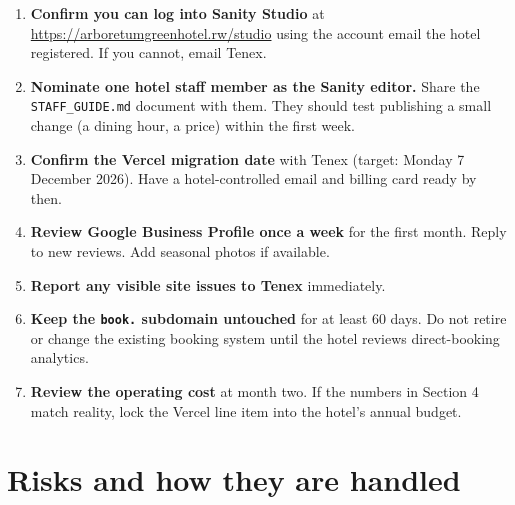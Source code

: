 \documentclass[11pt,a4paper]{article}
\begin{document}
\begin{enumerate}
\item \textbf{Confirm you can log into Sanity Studio} at \url{https://arboretumgreenhotel.rw/studio} using the account email the hotel registered. If you cannot, email Tenex.
\item \textbf{Nominate one hotel staff member as the Sanity editor.} Share the \texttt{STAFF\_GUIDE.md} document with them. They should test publishing a small change (a dining hour, a price) within the first week.
\item \textbf{Confirm the Vercel migration date} with Tenex (target: Monday 7 December 2026). Have a hotel-controlled email and billing card ready by then.
\item \textbf{Review Google Business Profile once a week} for the first month. Reply to new reviews. Add seasonal photos if available.
\item \textbf{Report any visible site issues to Tenex} immediately.
\item \textbf{Keep the \texttt{book.} subdomain untouched} for at least 60 days. Do not retire or change the existing booking system until the hotel reviews direct-booking analytics.
\item \textbf{Review the operating cost} at month two. If the numbers in Section 4 match reality, lock the Vercel line item into the hotel's annual budget.
\end{enumerate}

\section{Risks and how they are handled}
\end{document}
